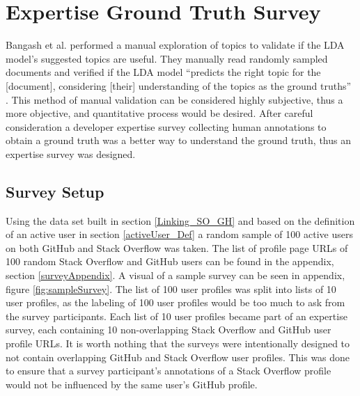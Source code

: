     
    \section{Expertise Ground Truth Survey}
    
        Bangash et al. \cite{bangash2019developers} performed a manual exploration of topics to validate if the LDA model's suggested topics are useful. They manually read randomly sampled documents and verified if the LDA model ``predicts the right topic for the [document], considering [their] understanding of the topics as the ground truths'' \cite{bangash2019developers}. This method of manual validation can be considered highly subjective, thus a more objective, and quantitative process would be desired. After careful consideration a developer expertise survey collecting human annotations to obtain a ground truth was a better way to understand the ground truth, thus an expertise survey was designed. 
    
        \subsection{Survey Setup}
        
            Using the data set built in section \ref{Linking_SO_GH} and based on the definition of an active user in section \ref{activeUser_Def} a random sample of 100 active users on both GitHub and Stack Overflow was taken. The list of profile page URLs of 100 random Stack Overflow and GitHub users can be found in the appendix, section \ref{surveyAppendix}. A visual of a sample survey can be seen in appendix, figure \ref{fig:sampleSurvey}. The list of 100 user profiles was split into lists of 10 user profiles, as the labeling of 100 user profiles would be too much to ask from the survey participants. Each list of 10 user profiles became part of an expertise survey, each containing 10 non-overlapping Stack Overflow and GitHub user profile URLs. It is worth nothing that the surveys were intentionally designed to not contain overlapping GitHub and Stack Overflow user profiles. This was done to ensure that a survey participant's annotations of a Stack Overflow profile would not be influenced by the same user's GitHub profile.
            

